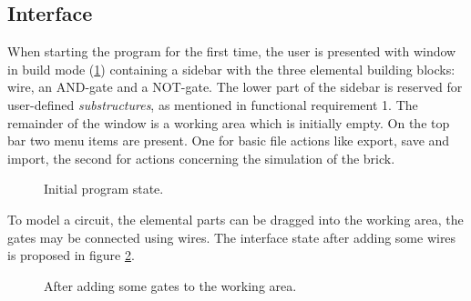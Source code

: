 \subsection{Interface} %



When starting the program for the first time, the user is presented with window in build mode (\ref{fig-interface-empty}) containing a sidebar with the three elemental building blocks: wire, an AND-gate and a NOT-gate. The lower part of the sidebar is reserved for user-defined \textit{substructures}, as mentioned in functional requirement 1.
The remainder of the window is a working area which is initially empty.
On the top bar two menu items are present. One for basic file actions like export, save and import, the second for actions concerning the simulation of the brick.

\begin{figure}[h!]
	\label{fig-interface-empty}
	\caption{Initial program state.}
	\centering{}
\end{figure}

\noindent To model a circuit, the elemental parts can be dragged into the working area, the gates may be connected using wires. The interface state after adding some wires is proposed in figure \ref{fig-interface-building}.

\begin{figure}[h!]
	\label{fig-interface-building}
	\caption{After adding some gates to the working area.}
	\centering
\end{figure}

